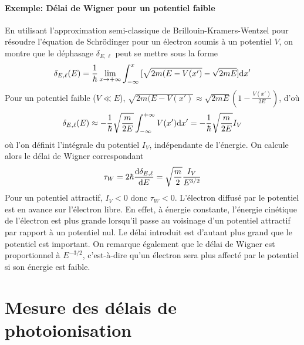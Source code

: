 \paragraph{Exemple: Délai de Wigner pour un potentiel faible}
En utilisant l'approximation semi-classique de Brillouin-Kramers-Wentzel pour résoudre l'équation de Schrödinger pour un électron soumis à un potentiel $V$, on montre que le déphasage $\delta_{E,\ell}$ peut se mettre sous la forme  
\begin{equation}
\delta_{E,\ell} (E) = \frac{1}{\hbar} \lim_{x \to + \infty} \int_{- \infty}^{x} { [\sqrt{2m(E-V(x')}-\sqrt{2mE}] \mathrm{d} x'}
\end{equation}
Pour un potentiel faible ($V \ll E $), $\sqrt{2m(E-V(x')} \approx \sqrt{2mE}(1-\frac{V(x')}{2E})$, d'où
\begin{equation}
\delta_{E,\ell} (E) \approx - \frac{1}{\hbar} \sqrt{\frac{m}{2E}} \int_{- \infty}^{+ \infty} { V(x')\mathrm{d} x'} = - \frac{1}{\hbar} \sqrt{\frac{m}{2E}} I_V
\end{equation}
où l'on définit l'intégrale du potentiel $I_V$, indépendante de l'énergie.
On calcule alors le délai de Wigner correspondant
\begin{equation}
\tau_W = 2 \hbar \frac{\mathrm{d} \delta_{E,\ell}}{\mathrm{d} E} = \sqrt{\frac{m}{2}} \frac{I_V}{E^{3/2}}
\end{equation}
Pour un potentiel attractif, $I_V < 0$ donc $\tau_W < 0$. L'électron diffusé par le potentiel est en avance sur l'électron libre. En effet, à énergie constante, l'énergie cinétique de l'électron est plus grande lorsqu'il passe au voisinage d'un potentiel attractif par rapport à un potentiel nul. Le délai introduit est d'autant plus grand que le potentiel est important.
On remarque également que le délai de Wigner est proportionnel à $E^{-3/2}$, c'est-à-dire qu'un électron sera plus affecté par le potentiel si son énergie est faible.


\section{Mesure des délais de photoionisation}
